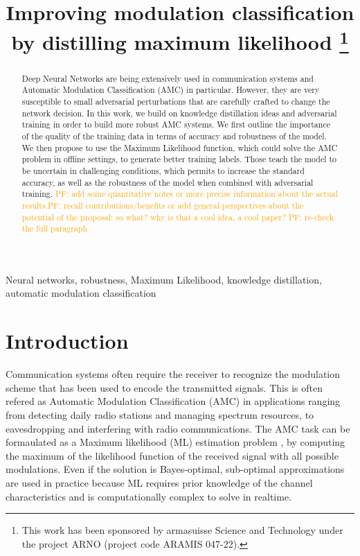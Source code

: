 \documentclass[conference]{IEEEtran}
\title{Improving modulation classification by distilling maximum likelihood \pf{Maximum Likelihood Distillation for Robust Modulation Classification}
\thanks{This work has been sponsored by armasuisse Science and Technology under the project ARNO (project code ARAMIS 047-22).}
}
\author{\IEEEauthorblockN{Javier Maroto}
\IEEEauthorblockA{\textit{Signal Processing Laboratory (LTS4)} \\ \textit{EPFL, Switzerland}}
\and
\IEEEauthorblockN{Gérôme Bovet}
\IEEEauthorblockA{\textit{armasuisse Science\&Technology} \\
\textit{Cyber-Defence Campus, Switzerland}}
\and
\IEEEauthorblockN{Pascal Frossard}
\IEEEauthorblockA{\textit{Signal Processing Laboratory (LTS4)} \\ \textit{EPFL, Switzerland}}}
\newcommand{\pf}[1]{{\textcolor{orange}{PF: {#1}}}}
\begin{document}
\maketitle

\begin{abstract}
Deep Neural Networks are being extensively used in communication systems and Automatic Modulation Classification (AMC) in particular. However, they are very susceptible to small adversarial perturbations that are carefully crafted to change the network decision. In this work, we build on knowledge distillation ideas and adversarial training in order to build more robust AMC systems. We first outline the importance of the quality of the training data in terms of accuracy and robustness of the model. We then propose to use the Maximum Likelihood function, which could solve the AMC problem in offline settings, to generate better training labels. Those teach the model to be uncertain in challenging conditions, which permits to increase the standard accuracy, as well as the robustness of the model when combined with adversarial training. \pf{add some quantitative notes or more precise information about the actual results.}\pf{recall contributions/benefits or add general perspectives about the potential of the proposal: so what? why is that a cool idea, a cool paper?} \pf{re-check the full paragraph} 
\end{abstract}

\begin{IEEEkeywords}
Neural networks, robustness, Maximum Likelihood, knowledge distillation, automatic modulation classification
\end{IEEEkeywords}

\section{Introduction}

Communication systems often require the receiver to recognize the modulation scheme that has been used to encode the transmitted signals. This is often refered as Automatic Modulation Classification (AMC) in applications ranging from detecting daily radio stations and managing spectrum resources, to eavesdropping and interfering with radio communications. The AMC task can be formaulated as a Maximum likelihood (ML) estimation problem \cite{huan1995likelihood,dobre2007survey,hameed2009likelihood}, by computing the maximum of the likelihood function of the received signal with all possible modulations. Even if the solution is Bayes-optimal, sub-optimal approximations are used in practice \cite{dobre2007survey,Hameed_Dobre_Popescu_2009} because ML requires prior knowledge of the channel characteristics and is computationally complex to solve in realtime.
\end{document}
